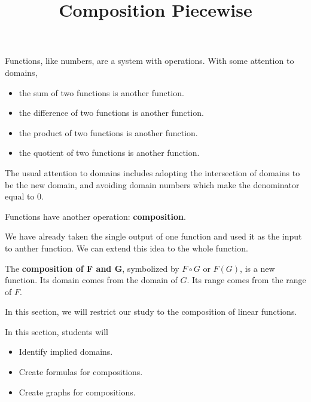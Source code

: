\documentclass{ximera}
\title{Composition Piecewise}
\begin{document}
\begin{abstract}
\end{abstract}
\maketitle




Functions, like numbers, are a system with operations.  With some attention to domains,

\begin{itemize}
\item the sum of two functions is another function.
\item the difference of two functions is another function.
\item the product of two functions is another function.
\item the quotient of two functions is another function.
\end{itemize}


The usual attention to domains includes adopting the intersection of domains to be the new domain, and avoiding domain numbers which make the denominator equal to $0$.



Functions have another operation: \textbf{composition}.

We have already taken the single output of one function and used it as the input to anther function.  We can extend this idea to the whole function.


The \textbf{composition of F and G}, symbolized by $F \circ G$ or $F(G)$, is a new function.  Its domain comes from the domain of $G$. Its range comes from the range of $F$.



In this section, we will restrict our study to the composition of linear functions.


















\begin{sectionOutcomes}
In this section, students will 

\begin{itemize}
\item Identify implied domains.
\item Create formulas for compositions.
\item Create graphs for compositions.
\end{itemize}
\end{sectionOutcomes}
\end{document}
